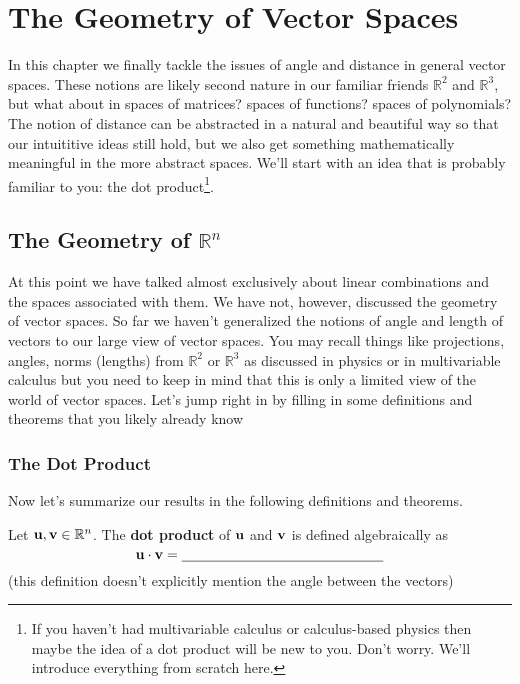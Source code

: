 \chapter{The Geometry of Vector Spaces}
In this chapter we finally tackle the issues of angle and distance in general vector
spaces.  These notions are likely second nature in our familiar friends $\mathbb{R}^2$ and
$\mathbb{R}^3$, but what about in spaces of matrices? spaces of functions? spaces of
polynomials?  The notion of distance can be abstracted in a natural and beautiful way so
that our intuititive ideas still hold, but we also get something mathematically meaningful
in the more abstract spaces.  We'll start with an idea that is probably familiar to you:
the dot product\footnote{If you haven't had multivariable calculus or calculus-based
    physics then maybe the idea of a dot product will be new to you.  Don't worry.  We'll
introduce everything from scratch here.}.

\section{The Geometry of $\mathbb{R}^n$}
At this point we have talked almost exclusively about linear combinations and the spaces
associated with them.  We have not, however, discussed the geometry of vector spaces.  So
far we haven't generalized the notions of angle and length of vectors to our large view of
vector spaces.  You may recall things like projections, angles, norms (lengths) from
$\mathbb{R}^2$ or $\mathbb{R}^3$ as discussed in physics or in multivariable calculus but
you need to keep in mind that this is only a limited view of the world of vector spaces.
Let's jump right in by filling in some definitions and theorems that you likely already
know

\subsection{The Dot Product}
Now let's summarize our results in the following definitions and theorems.
\begin{definition}
    Let ${\bf u}, {\bf v} \in \mathbb{R}^n$.  The {\bf dot product} of ${\bf u}$ and ${\bf v}$ is defined
    algebraically as
    \[ {\bf u} \cdot {\bf v} = \underline{\hspace{2in}} \]
    (this definition doesn't explicitly mention the angle between the vectors)
\end{definition}

